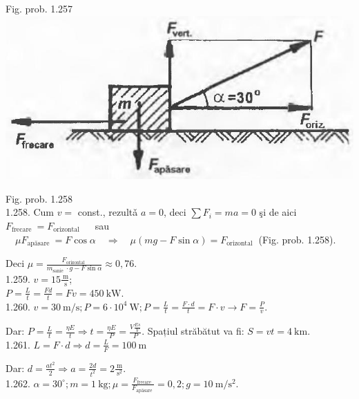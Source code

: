 \documentclass[10pt]{article}
\begin{document}
Fig. prob. 1.257\\
\includegraphics[max width=\textwidth, center]{2025_07_01_5b3ff9fa0d508c8e9f17g-253}

Fig. prob. 1.258\\
1.258. Cum $v=$ const., rezultǎ $a=0$, deci $\sum F_{i}=m a=0$ şi de aici $F_{\text {frecare }}=F_{\text {orizontal }} \quad$ sau $\quad \mu F_{\text {apăsare }}=F \cos \alpha \quad \Rightarrow \quad \mu(m g-F \sin \alpha)=F_{\text {orizontal }}$ (Fig. prob. 1.258).

Deci $\mu=\frac{F_{\text {orizontal }}}{m_{\text {sanie }} \cdot g-F \sin \alpha} \approx 0,76$.\\
1.259. $v=15 \frac{\mathrm{~m}}{\mathrm{~s}}$;\\
$P=\frac{L}{t}=\frac{F d}{t}=F v=450 \mathrm{~kW}$.\\
1.260. $v=30 \mathrm{~m} / \mathrm{s} ; P=6 \cdot 10^{4} \mathrm{~W} ; P=\frac{L}{t}=\frac{F \cdot d}{t}=F \cdot v \rightarrow F=\frac{P}{v}$.

Dar: $P=\frac{L}{t}=\frac{\eta E}{t} \Rightarrow t=\frac{\eta E}{P}=\frac{V \frac{E s}{V}}{P}$. Spațiul străbătut va fi: $S=v t=4 \mathrm{~km}$.\\
1.261. $L=F \cdot d \Rightarrow d=\frac{L}{F}=100 \mathrm{~m}$

Dar: $d=\frac{a t^{2}}{2} \Rightarrow a=\frac{2 d}{t^{2}}=2 \frac{\mathrm{~m}}{\mathrm{~s}^{2}}$.\\
1.262. $\alpha=30^{\circ} ; m=1 \mathrm{~kg} ; \mu=\frac{F_{\text {frecare }}}{F_{\text {apăsare }}}=0,2 ; g=10 \mathrm{~m} / \mathrm{s}^{2}$.
\end{document}
